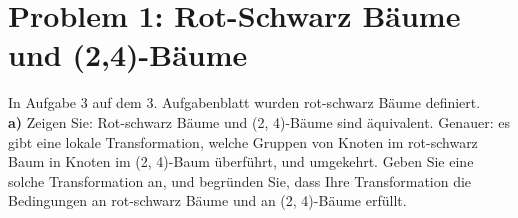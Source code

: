 
\section*{Problem 1: Rot-Schwarz Bäume und (2,4)-Bäume}

In Aufgabe 3 auf dem 3. Aufgabenblatt wurden rot-schwarz Bäume definiert.\\


\textbf{a)} Zeigen Sie: Rot-schwarz Bäume und (2, 4)-Bäume sind äquivalent. Genauer: es gibt eine lokale Transformation, welche Gruppen von Knoten im rot-schwarz Baum in Knoten im (2, 4)-Baum überführt, und umgekehrt. Geben Sie eine
solche Transformation an, und begründen Sie, dass Ihre Transformation die Bedingungen an rot-schwarz Bäume und an (2, 4)-Bäume erfüllt.